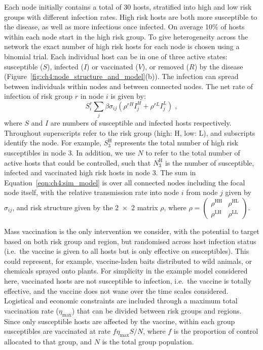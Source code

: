 Each node initially contains a total of 30 hosts, stratified into high and low risk groups with different infection rates. High risk hosts are both more susceptible to the disease, as well as more infectious once infected. On average 10\% of hosts within each node start in the high risk group. To give heterogeneity across the network the exact number of high risk hosts for each node is chosen using a binomial trial. Each individual host can be in one of three active states: susceptible ($S$), infected ($I$) or vaccinated ($V$), or removed ($R$) by the disease (Figure~\ref{fig:ch4:node_structure_and_model}(b)). The infection can spread between individuals within nodes and between connected nodes. The net rate of infection of risk group $r$ in node $i$ is given by:
\begin{equation}\label{eqn:ch4:sim_model}
    S_i^r \sum_j\beta\sigma_{ij} \left(\rho^{rH}I_j^H + \rho^{rL}I_j^L\right)\;,
\end{equation}
where $S$ and $I$ are numbers of susceptible and infected hosts respectively. Throughout superscripts refer to the risk group (high: H, low: L), and subscripts identify the node. For example, $S_{3}^\mathrm{H}$ represents the total number of high risk susceptibles in node 3. In addition, we use $N$ to refer to the total number of active hosts that could be controlled, such that $N_{3}^\mathrm{H}$ is the number of susceptible, infected and vaccinated high risk hosts in node 3. The sum in Equation~\ref{eqn:ch4:sim_model} is over all connected nodes including the focal node itself, with the relative transmission rate into node $i$ from node $j$ given by $\sigma_{ij}$, and risk structure given by the \num{2x2} matrix $\rho$, where $\rho = \left(\begin{smallmatrix}
    \rho^{\mathrm{HH}}& \rho^{\mathrm{HL}}\\
    \rho^{\mathrm{LH}}& \rho^{\mathrm{LL}}
    \end{smallmatrix}\right)$.

Mass vaccination is the only intervention we consider, with the potential to target based on both risk group and region, but randomised across host infection status (i.e.\ the vaccine is given to all hosts but is only effective on susceptibles). This could represent, for example, vaccine-laden baits distributed to wild animals, or chemicals sprayed onto plants. For simplicity in the example model considered here, vaccinated hosts are not susceptible to infection, i.e.\ the vaccine is totally effective, and the vaccine does not wane over the time scales considered. Logistical and economic constraints are included through a maximum total vaccination rate ($\eta_{\mathrm{max}}$) that can be divided between risk groups and regions. Since only susceptible hosts are affected by the vaccine, within each group susceptibles are vaccinated at rate $f\eta_{\mathrm{max}}S/N$, where $f$ is the proportion of control allocated to that group, and $N$ is the total group population.

